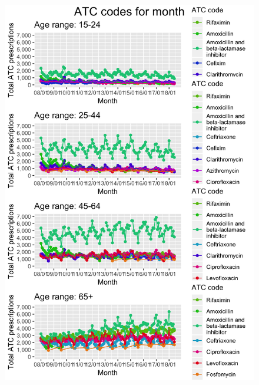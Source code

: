 \begin{figure}[h]
	\centering
	\includegraphics[scale=0.29]{../plots/top_atc_age-month.png}
\end{figure}

